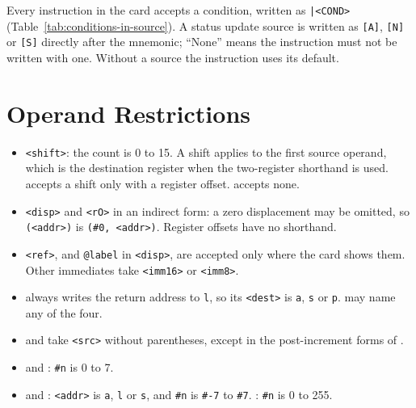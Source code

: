 Every instruction in the card accepts a condition, written as \texttt{|<COND>} (Table~\ref{tab:conditions-in-source}).
A status update source is written as \texttt{[A]}, \texttt{[N]} or \texttt{[S]} directly after the mnemonic; ``None''
means the instruction must not be written with one. Without a source the instruction uses its default.

\section{Operand Restrictions}

\begin{itemize}
	\item \texttt{<shift>}: the count is 0 to 15. A shift applies to the first source operand, which is the destination
	      register when the two-register shorthand is used.  accepts a shift only with a register offset.
	       accepts none.
	\item \texttt{<disp>} and \texttt{<rO>} in an indirect form: a zero displacement may be omitted, so
	      \texttt{(<addr>)} is \texttt{(\#0, <addr>)}. Register offsets have no shorthand.
	\item \texttt{<ref>}, and \texttt{@label} in \texttt{<disp>}, are accepted only where the card shows them. Other
	      immediates take \texttt{<imm16>} or \texttt{<imm8>}.
	\item {} always writes the return address to \texttt{l}, so its \texttt{<dest>} is \texttt{a},
	      \texttt{s} or \texttt{p}.  may name any of the four.
	\item {} and  take \texttt{<src>} without parentheses, except in the post-increment
	      forms of .
	\item {} and : \texttt{\#n} is 0 to 7.
	\item {} and : \texttt{<addr>} is \texttt{a}, \texttt{l} or \texttt{s}, and \texttt{\#n} is
	      \texttt{\#-7} to \texttt{\#7}. : \texttt{\#n} is 0 to 255.
\end{itemize}
